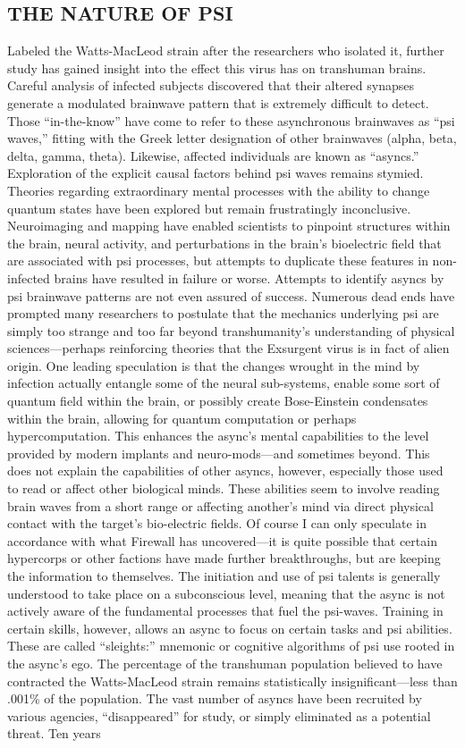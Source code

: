\subsection{THE NATURE OF PSI} Labeled the Watts-MacLeod strain after the researchers who isolated it, further study has gained insight into the effect this virus has on transhuman brains. Careful analysis of infected subjects discovered that their altered synapses generate a modulated brainwave pattern that is extremely difficult to detect. Those “in-the-know” have come to refer to these asynchronous brainwaves as “psi waves,” fitting with the Greek letter designation of other brainwaves (alpha, beta, delta, gamma, theta). Likewise, affected individuals are known as “asyncs.” Exploration of the explicit causal factors behind psi waves remains stymied. Theories regarding extraordinary mental processes with the ability to change quantum states have been explored but remain frustratingly inconclusive. Neuroimaging and mapping have enabled scientists to pinpoint structures within the brain, neural activity, and perturbations in the brain’s bioelectric field that are associated with psi processes, but attempts to duplicate these features in non-infected brains have resulted in failure or worse. Attempts to identify asyncs by psi brainwave patterns are not even assured of success. Numerous dead ends have prompted many researchers to postulate that the mechanics underlying psi are simply too strange and too far beyond transhumanity’s understanding of physical sciences—perhaps reinforcing theories that the Exsurgent virus is in fact of alien origin. One leading speculation is that the changes wrought in the mind by infection actually entangle some of the neural sub-systems, enable some sort of quantum field within the brain, or possibly create Bose-Einstein condensates within the brain, allowing for quantum computation or perhaps hypercomputation. This enhances the async’s mental capabilities to the level provided by modern implants and neuro-mods—and sometimes beyond. This does not explain the capabilities of other asyncs, however, especially those used to read or affect other biological minds. These abilities seem to involve reading brain waves from a short range or affecting another’s mind via direct physical contact with the target’s bio-electric fields. Of course I can only speculate in accordance with what Firewall has uncovered—it is quite possible that certain hypercorps or other factions have made further breakthroughs, but are keeping the information to themselves. The initiation and use of psi talents is generally understood to take place on a subconscious level, meaning that the async is not actively aware of the fundamental processes that fuel the psi-waves. Training in certain skills, however, allows an async to focus on certain tasks and psi abilities. These are called “sleights:” mnemonic or cognitive algorithms of psi use rooted in the async’s ego. The percentage of the transhuman population believed to have contracted the Watts-MacLeod strain remains statistically insignificant—less than .001\% of the population. The vast number of asyncs have been recruited by various agencies, “disappeared” for study, or simply eliminated as a potential threat. Ten years 